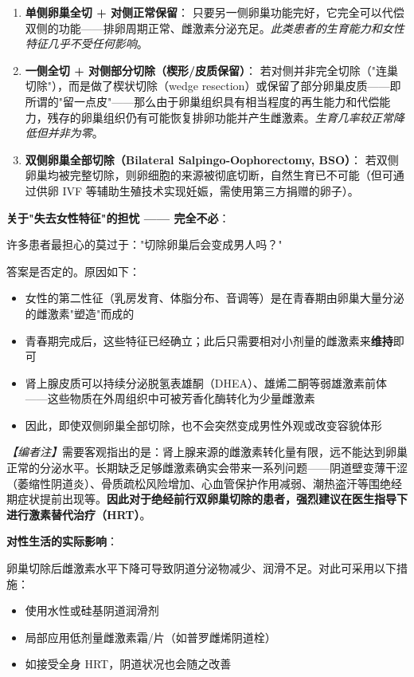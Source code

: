 \begin{enumerate}
	\item \textbf{单侧卵巢全切 + 对侧正常保留}：
	只要另一侧卵巢功能完好，它完全可以代偿双侧的功能——排卵周期正常、雌激素分泌充足。\textit{此类患者的生育能力和女性特征几乎不受任何影响}。

	\item \textbf{一侧全切 + 对侧部分切除（楔形/皮质保留）}：
	若对侧并非完全切除（"连巢切除"），而是做了楔状切除（wedge resection）或保留了部分卵巢皮质——即所谓的"留一点皮"——那么由于卵巢组织具有相当程度的再生能力和代偿能力，残存的卵巢组织仍有可能恢复排卵功能并产生雌激素。\textit{生育几率较正常降低但并非为零}。

	\item \textbf{双侧卵巢全部切除（Bilateral Salpingo-Oophorectomy, BSO）}：
	若双侧卵巢均被完整切除，则卵细胞的来源被彻底切断，自然生育已不可能（但可通过供卵 IVF 等辅助生殖技术实现妊娠，需使用第三方捐赠的卵子）。
\end{enumerate}

\vspace{0.5em}
\noindent\textbf{关于"失去女性特征"的担忧 —— 完全不必}：

许多患者最担心的莫过于："切除卵巢后会变成男人吗？"

答案是否定的。原因如下：

\begin{itemize}
	\item 女性的第二性征（乳房发育、体脂分布、音调等）是在青春期由卵巢大量分泌的雌激素"塑造"而成的
	\item 青春期完成后，这些特征已经确立；此后只需要相对小剂量的雌激素来\textbf{维持}即可
	\item 肾上腺皮质可以持续分泌脱氢表雄酮（DHEA）、雄烯二酮等弱雄激素前体——这些物质在外周组织中可被芳香化酶转化为少量雌激素
	\item 因此，即使双侧卵巢全部切除，也不会突然变成男性外观或改变容貌体形
\end{itemize}

\noindent\textit{【编者注】}需要客观指出的是：肾上腺来源的雌激素转化量有限，远不能达到卵巢正常的分泌水平。长期缺乏足够雌激素确实会带来一系列问题——阴道壁变薄干涩（萎缩性阴道炎）、骨质疏松风险增加、心血管保护作用减弱、潮热盗汗等围绝经期症状提前出现等。\textbf{因此对于绝经前行双卵巢切除的患者，强烈建议在医生指导下进行激素替代治疗（HRT）}。

\vspace{0.5em}
\noindent\textbf{对性生活的实际影响}：

卵巢切除后雌激素水平下降可导致阴道分泌物减少、润滑不足。对此可采用以下措施：
\begin{itemize}
	\item 使用水性或硅基阴道润滑剂
	\item 局部应用低剂量雌激素霜/片（如普罗雌烯阴道栓）
	\item 如接受全身 HRT，阴道状况也会随之改善
\end{itemize}

